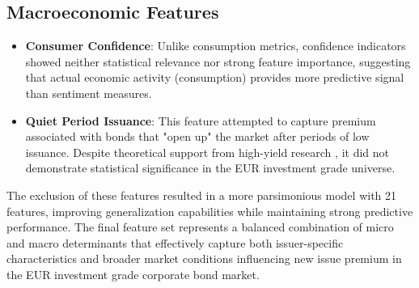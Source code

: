 \subsection{Macroeconomic Features}

\begin{itemize}
    \item \textbf{Consumer Confidence}: Unlike consumption metrics, confidence indicators showed neither statistical relevance nor strong feature importance, suggesting that actual economic activity (consumption) provides more predictive signal than sentiment measures.
    \item \textbf{Quiet Period Issuance}: This feature attempted to capture premium associated with bonds that "open up" the market after periods of low issuance. Despite theoretical support from high-yield research \parencite{Geerts2022PredictingYield}, it did not demonstrate statistical significance in the EUR investment grade universe.
\end{itemize}

The exclusion of these features resulted in a more parsimonious model with 21 features, improving generalization capabilities while maintaining strong predictive performance. The final feature set represents a balanced combination of micro and macro determinants that effectively capture both issuer-specific characteristics and broader market conditions influencing new issue premium in the EUR investment grade corporate bond market.